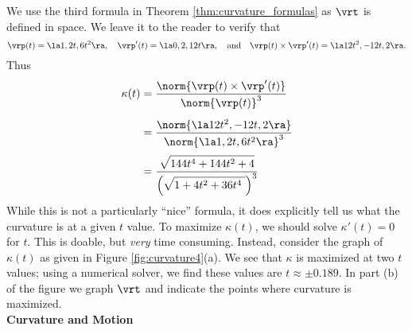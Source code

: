 {We use the third formula in Theorem \ref{thm:curvature_formulas} as $\vrt$ is defined in space. We leave it to the reader to verify that 
\[
\vrp(t) =\la 1,2t,6t^2\ra,\quad \vrp'(t) = \la 0,2,12t\ra,\quad \text{and}\quad \vrp(t)\times \vrp'(t) = \la 12t^2,-12t,2\ra.
\]
Thus 
\begin{align*}
\kappa(t) &= \frac{\norm{\vrp(t)\times\vrp'(t)}}{\norm{\vrp(t)}^3} \\
				&= \rule{0pt}{20pt}\frac{\norm{\la 12t^2,-12t,2\ra}}{\norm{\la 1,2t,6t^2\ra}^3} \\
				&= \rule{0pt}{20pt}\frac{\sqrt{\rule{0pt}{8.5pt}144t^4+144t^2+4}}{\left(\sqrt{\rule{0pt}{8.5pt}1+4t^2+36t^4\ }\right)^3}
\end{align*}
While this is not a particularly ``nice'' formula, it does explicitly tell us what the curvature is at a given $t$ value. To maximize $\kappa(t)$, we should solve $\kappa'(t)=0$ for $t$. This is doable, but \emph{very} time consuming. Instead, consider the graph of $\kappa(t)$ as given in Figure \ref{fig:curvature4}(a). We see that $\kappa$ is maximized at two $t$ values; using a numerical solver, we find these values are $t\approx\pm 0.189$. In part (b) of the figure we graph $\vrt$ and indicate the points where curvature is maximized.
}\\

\noindent\textbf{\large Curvature and Motion}\\

